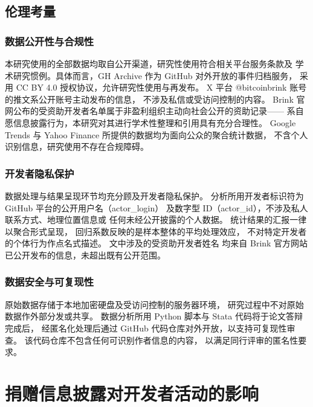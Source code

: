 \documentclass[
    type = master, %
    degree = professional,        %
    decl-page,  %
    twoside,                %
    fontset = fandol %
  ]{njuthesis}
\begin{document}
\section{伦理考量}

\subsection{数据公开性与合规性}

本研究使用的全部数据均取自公开渠道，研究性使用符合相关平台服务条款及
学术研究惯例。具体而言，GH Archive 作为 GitHub 对外开放的事件归档服务，
采用 CC BY 4.0 授权协议，允许研究性使用与再发布。
X 平台 @bitcoinbrink 账号的推文系公开账号主动发布的信息，
不涉及私信或受访问控制的内容。
Brink 官网公布的受资助开发者名单属于非盈利组织主动向社会公开的资助记录——
系自愿信息披露行为，本研究对其进行学术性整理和引用具有充分合理性。
Google Trends 与 Yahoo Finance 所提供的数据均为面向公众的聚合统计数据，
不含个人识别信息，研究使用不存在合规障碍。

\subsection{开发者隐私保护}

数据处理与结果呈现环节均充分顾及开发者隐私保护。
分析所用开发者标识符为 GitHub 平台的公开用户名（actor\_login）
及数字型 ID（actor\_id），不涉及私人联系方式、地理位置信息或
任何未经公开披露的个人数据。
统计结果的汇报一律以聚合形式呈现，
回归系数反映的是样本整体的平均处理效应，
不对特定开发者的个体行为作点名式描述。
文中涉及的受资助开发者姓名
均来自 Brink 官方网站已公开发布的信息，未超出既有公开范围。

\subsection{数据安全与可复现性}

原始数据存储于本地加密硬盘及受访问控制的服务器环境，
研究过程中不对原始数据作外部分发或共享。
数据分析所用 Python 脚本与 Stata 代码将于论文答辩完成后，
经匿名化处理后通过 GitHub 代码仓库对外开放，以支持可复现性审查。
该代码仓库不包含任何可识别作者信息的内容，
以满足同行评审的匿名性要求。


\chapter{捐赠信息披露对开发者活动的影响}
\end{document}
